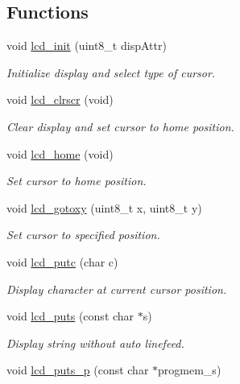 \subsection*{Functions}
\begin{DoxyCompactItemize}
\item 
void \hyperlink{group__pfleury__lcd_ga9af28b2779326b63ff4356e2b1828984}{lcd\+\_\+init} (uint8\+\_\+t disp\+Attr)
\begin{DoxyCompactList}\small\item\em Initialize display and select type of cursor. \end{DoxyCompactList}\item 
void \hyperlink{group__pfleury__lcd_gaf8da853dba4b9d5f2aea4e294444e14d}{lcd\+\_\+clrscr} (void)
\begin{DoxyCompactList}\small\item\em Clear display and set cursor to home position. \end{DoxyCompactList}\item 
void \hyperlink{group__pfleury__lcd_ga3aabf730aa4e0393bb5c959583c00a8e}{lcd\+\_\+home} (void)
\begin{DoxyCompactList}\small\item\em Set cursor to home position. \end{DoxyCompactList}\item 
void \hyperlink{group__pfleury__lcd_gadbf47a5efdf02367ded1ebf8f9edb5fe}{lcd\+\_\+gotoxy} (uint8\+\_\+t x, uint8\+\_\+t y)
\begin{DoxyCompactList}\small\item\em Set cursor to specified position. \end{DoxyCompactList}\item 
void \hyperlink{group__pfleury__lcd_gafa7e36b95c43d603f510273ad077cbbe}{lcd\+\_\+putc} (char c)
\begin{DoxyCompactList}\small\item\em Display character at current cursor position. \end{DoxyCompactList}\item 
void \hyperlink{group__pfleury__lcd_ga8ffdfcac7638368ff04364c14984266e}{lcd\+\_\+puts} (const char $\ast$s)
\begin{DoxyCompactList}\small\item\em Display string without auto linefeed. \end{DoxyCompactList}\item 
void \hyperlink{group__pfleury__lcd_ga9022a24a56a9b15681f62eb6ba77e5de}{lcd\+\_\+puts\+\_\+p} (const char $\ast$progmem\+\_\+s)

\end{DoxyCompactItemize}
